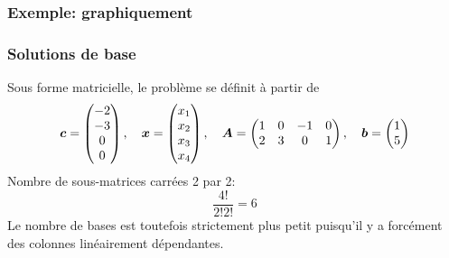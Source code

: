 \documentclass[usepdftitle=false]{beamer}
\begin{document}
\begin{frame}
\frametitle{Exemple: graphiquement}

\begin{center}
\end{center}

\end{frame}

\begin{frame}
\frametitle{Solutions de base}

Sous forme matricielle, le problème se définit à partir de
$$
{\boldsymbol{c}} = \begin{pmatrix}
-2 \\ -3 \\ 0 \\ 0
\end{pmatrix}, \quad
{\boldsymbol{x}} = \begin{pmatrix}
x_1 \\ x_2 \\ x_3 \\ x_4
\end{pmatrix},\quad
{\boldsymbol{A}} = \begin{pmatrix}
1 & 0 & -1 & 0 \\
2 & 3 & 0 & 1 \\
\end{pmatrix},\quad
{\boldsymbol{b}} = \begin{pmatrix}
1 \\ 5
\end{pmatrix}
$$
Nombre de sous-matrices carrées 2 par 2:
$$
\frac{4!}{2!2!} = 6
$$
Le nombre de bases est toutefois strictement plus petit puisqu'il y a forcément des colonnes linéairement dépendantes.

\end{frame}
\end{document}
